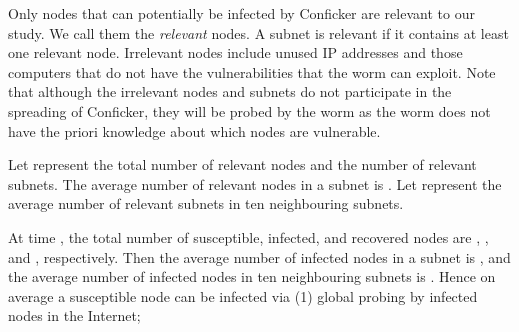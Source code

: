 \documentclass[9pt]{article}
\begin{document}
Only nodes that can potentially be infected by Conficker are relevant to our study. We call them the {\em relevant} nodes.
A subnet is relevant if it contains at least one relevant node. 
Irrelevant nodes include unused IP addresses and those computers that do not have the vulnerabilities that the worm can exploit.  Note that although the irrelevant nodes and subnets do not participate in the spreading of Conficker, they will be probed by the worm as the worm does not have the priori knowledge about which nodes are vulnerable. 

Let  represent the total number of relevant nodes and  the number of relevant subnets. The average number of relevant nodes in a subnet is .
Let  represent the average number of relevant subnets in ten neighbouring subnets.

At time , the total number of susceptible, infected, and recovered nodes  are , , and , respectively.
Then the average number of infected nodes in a subnet is , 
and the average number of infected nodes in ten neighbouring subnets is .
Hence on average a susceptible node can be infected via 
(1) {global probing} by  infected nodes in the Internet; 
\end{document}
